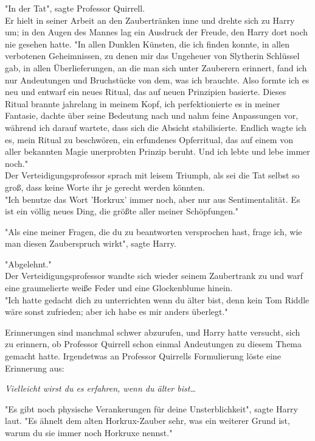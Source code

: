 {"In der Tat", sagte Professor Quirrell.\\ Er hielt in seiner Arbeit an den Zaubertränken inne und drehte sich zu Harry um; in den Augen des Mannes lag ein Ausdruck der Freude, den Harry dort noch nie gesehen hatte. "In allen Dunklen Künsten, die ich finden konnte, in allen verbotenen Geheimnissen, zu denen mir das Ungeheuer von Slytherin Schlüssel gab, in allen Überlieferungen, an die man sich unter Zauberern erinnert, fand ich nur Andeutungen und Bruchstücke von dem, was ich brauchte. Also formte ich es neu und entwarf ein neues Ritual, das auf neuen Prinzipien basierte. Dieses Ritual brannte jahrelang in meinem Kopf, ich perfektionierte es in meiner Fantasie, dachte über seine Bedeutung nach und nahm feine Anpassungen vor, während ich darauf wartete, dass sich die Absicht stabilisierte. Endlich wagte ich es, mein Ritual zu beschwören, ein erfundenes Opferritual, das auf einem von aller bekannten Magie unerprobten Prinzip beruht. Und ich lebte und lebe immer noch."\\ Der Verteidigungsprofessor sprach mit leisem Triumph, als sei die Tat selbst so groß, dass keine Worte ihr je gerecht werden könnten.\\ "Ich benutze das Wort 'Horkrux' immer noch, aber nur aus Sentimentalität. Es ist ein völlig neues Ding, die größte aller meiner Schöpfungen."

"Als eine meiner Fragen, die du zu beantworten versprochen hast, frage ich, wie man diesen Zauberspruch wirkt", sagte Harry.

"Abgelehnt."\\ Der Verteidigungsprofessor wandte sich wieder seinem Zaubertrank zu und warf eine graumelierte weiße Feder und eine Glockenblume hinein.\\ "Ich hatte gedacht dich zu unterrichten wenn du älter bist, denn kein Tom Riddle wäre sonst zufrieden; aber ich habe es mir anders überlegt."

Erinnerungen sind manchmal schwer abzurufen, und Harry hatte versucht, sich zu erinnern, ob Professor Quirrell schon einmal Andeutungen zu diesem Thema gemacht hatte. Irgendetwas an Professor Quirrells Formulierung löste eine Erinnerung aus:

\emph{Vielleicht wirst du es erfahren, wenn du älter bist…}

"Es gibt noch physische Verankerungen für deine Unsterblichkeit", sagte Harry laut. "Es ähnelt dem alten Horkrux-Zauber sehr, was ein weiterer Grund ist, warum du sie immer noch Horkruxe nennst."

}
